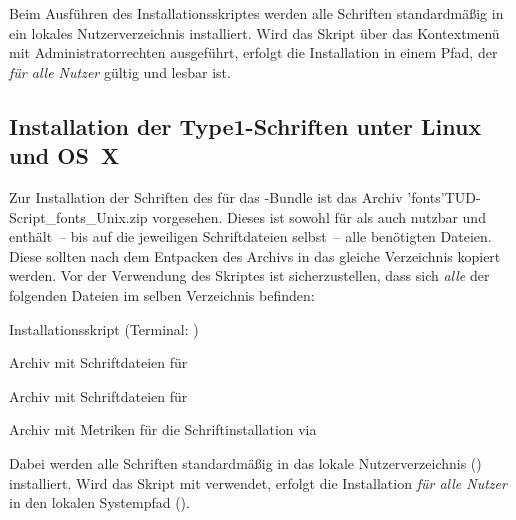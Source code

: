 Beim Ausführen des Installationsskriptes werden alle Schriften standardmäßig in 
ein lokales Nutzerverzeichnis installiert. Wird das Skript über das Kontextmenü 
mit Administratorrechten ausgeführt, erfolgt die Installation in einem Pfad, 
der \emph{für alle Nutzer} gültig und lesbar ist.



\subsection{%
  Installation der Type1-Schriften unter Linux und OS~X%
  \label{sec:install:unix}%
}

Zur Installation der Schriften des \CDs für das \TUDScript-Bundle ist das 
Archiv \GitHubFile*'fonts'{TUD-Script_fonts_Unix.zip} vorgesehen. Dieses 
ist sowohl für \TeXLive als auch \MacTeX nutzbar und enthält~-- bis auf die 
jeweiligen Schriftdateien selbst~-- alle benötigten Dateien. Diese sollten nach 
dem Entpacken des Archivs in das gleiche Verzeichnis kopiert werden. Vor der 
Verwendung des Skriptes  ist sicherzustellen, 
dass sich \emph{alle} der folgenden Dateien im selben Verzeichnis befinden:
%
\settowidth{}%
\begin{description}[labelwidth=\tempdim,labelsep=.5em]
  \item[\File*{tudscr_fonts_install.sh}]Installationsskript
    (Terminal: )
  \item[\File*{Univers_PS.zip}]Archiv mit Schriftdateien für \Univers
  \item[\File*{DIN_Bd_PS.zip}]Archiv mit Schriftdateien für \DIN
  \item[\File*{tudscr_fonts_install.zip}]Archiv mit Metriken für die
    Schriftinstallation via 
\end{description}



Dabei werden alle Schriften standardmäßig in das lokale Nutzerverzeichnis 
() installiert. Wird das Skript mit  verwendet, 
erfolgt die Installation \emph{für alle Nutzer} in den lokalen Systempfad 
().

